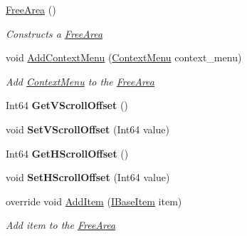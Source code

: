 \begin{DoxyCompactItemize}
\item 
\mbox{\hyperlink{class_space_v_i_l_1_1_free_area_a66c2dcb40e9cacde8f342c20a5193d96}{Free\+Area}} ()
\begin{DoxyCompactList}\small\item\em Constructs a \mbox{\hyperlink{class_space_v_i_l_1_1_free_area}{Free\+Area}} \end{DoxyCompactList}\item 
void \mbox{\hyperlink{class_space_v_i_l_1_1_free_area_af8b1aa9fc2390fb36a34b6bf4d1ef76a}{Add\+Context\+Menu}} (\mbox{\hyperlink{class_space_v_i_l_1_1_context_menu}{Context\+Menu}} context\+\_\+menu)
\begin{DoxyCompactList}\small\item\em Add \mbox{\hyperlink{class_space_v_i_l_1_1_context_menu}{Context\+Menu}} to the \mbox{\hyperlink{class_space_v_i_l_1_1_free_area}{Free\+Area}} \end{DoxyCompactList}\item 
\mbox{\label{class_space_v_i_l_1_1_free_area_a4c8146cf698c74fe8b1d45563bff7deb}} 
Int64 {\bfseries Get\+V\+Scroll\+Offset} ()
\item 
\mbox{\label{class_space_v_i_l_1_1_free_area_a6d100b7db1e39e65dd36948f5d6ac7c5}} 
void {\bfseries Set\+V\+Scroll\+Offset} (Int64 value)
\item 
\mbox{\label{class_space_v_i_l_1_1_free_area_ae54bfdfc27abafeca195855a88068108}} 
Int64 {\bfseries Get\+H\+Scroll\+Offset} ()
\item 
\mbox{\label{class_space_v_i_l_1_1_free_area_a0d5c172e4651d0641fd4c380ab0ba265}} 
void {\bfseries Set\+H\+Scroll\+Offset} (Int64 value)
\item 
override void \mbox{\hyperlink{class_space_v_i_l_1_1_free_area_a9145cbd1711d975fee90fde3187c1aff}{Add\+Item}} (\mbox{\hyperlink{interface_space_v_i_l_1_1_core_1_1_i_base_item}{I\+Base\+Item}} item)
\begin{DoxyCompactList}\small\item\em Add item to the \mbox{\hyperlink{class_space_v_i_l_1_1_free_area}{Free\+Area}} \end{DoxyCompactList}\item 

\end{DoxyCompactItemize}
